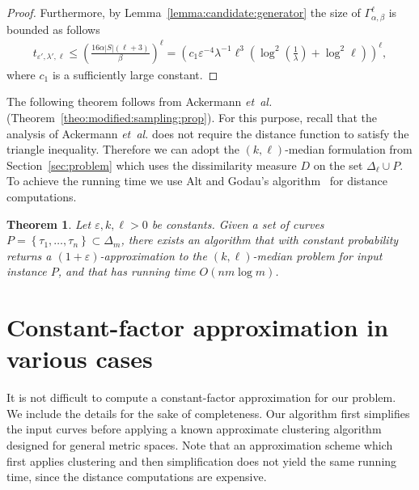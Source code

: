 \documentclass[11pt, letter]{article}
\newcommand{\etal}{\textit{e{}t~a{}l.}\xspace}
\newtheorem{theorem}{Theorem}[section]
\newcommand{\seclab}[1]{\label{sec:#1}}
\newcommand{\secref}[1]{Section~\ref{sec:#1}}
\newcommand{\thmlab}[1]{{\label{theo:#1}}}
\newcommand{\thmref}[1]{Theorem~\ref{theo:#1}}
\newcommand{\lemref}[1]{Lemma~\ref{lemma:#1}}
\providecommand{\eps}{{\varepsilon}}\newcommand{\Astop}{\overline{a}}
\providecommand{\pth}[2][\!]{#1\left({#2}\right)}
\providecommand{\brc}[1]{\left\{ {#1} \right\}}
\newcommand{\nrClusters}{\ensuremath{k}}
\newcommand{\lenClusters}{\ensuremath{\ell}}
\newcommand{\trajectory}[2]{\ensuremath{{#1}_{#2}}}
\newcommand{\inputSym}{\ensuremath{\tau}}
\newcommand{\inputTraj}[1]{\trajectory{\inputSym}{#1}}
\begin{document}
\begin{proof}
Furthermore, by \lemref{candidate:generator} the size of $\Gamma^{\lenClusters}_{\alpha,\beta}$ is bounded as follows
\begin{align*}
t_{\eps',\lambda',\lenClusters} 
\leq \left({\frac{16\alpha |S|(\lenClusters+3)}{\beta}}\right)^{\lenClusters} 
= \pth{c_1 \eps^{-4}\lambda^{-1} \lenClusters^3 \pth{\log^2\pth{\frac{1}{\lambda}}+\log^2 \lenClusters}}^{\lenClusters},
\end{align*}
where $c_1$ is a sufficiently large constant.
\end{proof}







The following theorem follows from Ackermann \etal~\cite{abs-cm-10} (\thmref{modified:sampling:prop}).
For this purpose, recall that the analysis of Ackermann \etal does not require the distance function 
to satisfy the triangle inequality. Therefore we can adopt the $(k,\ell)$-median formulation from 
\secref{problem} which uses the dissimilarity measure $D$ on the set $\Delta_{\ell} \cup P$. 
To achieve the running time we use Alt and Godau's algorithm~\cite{ag-cfdbt-95} for distance computations.




\begin{theorem}\thmlab{k:l:median:main}
Let $\eps, k,\ell >0$ be constants.
Given a set of curves $P=\brc{\inputTraj{1},\dots,\inputTraj{n}} \subset
\Delta_{m}$, there exists an algorithm that with
constant probability returns a $(1+\eps)$-approximation to the
$(\nrClusters,\lenClusters)$-median problem for input instance $P$, and that
has running time $O(n m \log m)$.
\end{theorem}



\section{Constant-factor approximation in various cases}
\seclab{cf:approx:uni}

It is not difficult to compute a constant-factor approximation for our problem.
We include the details for the sake of completeness. Our algorithm first
simplifies the input curves before applying a known approximate clustering algorithm
designed for general metric spaces.  Note that an approximation scheme which
first applies clustering and then simplification does not yield the same
running time, since the distance computations are expensive.
\end{document}
